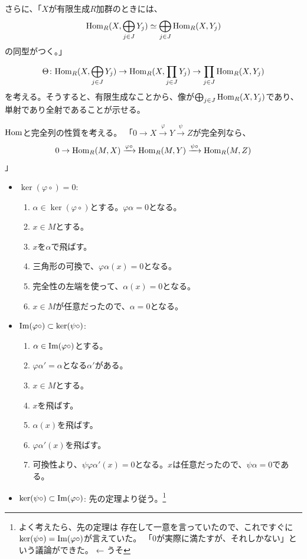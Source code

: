 \documentclass[9pt]{ltjsarticle}
\def\MARU#1{\textcircled{\scriptsize #1}}
\begin{document}
さらに、「$X$が有限生成$R$加群のときには、
\begin{align}
  \mathrm{Hom}_R(X,\bigoplus_{j\in J}Y_j)\simeq \bigoplus_{j\in J}\mathrm{Hom}_R(X,Y_j)
\end{align}
の同型がつく。」
\begin{myproof}
  \begin{align}
    \Theta\colon \mathrm{Hom}_R(X,\bigoplus_{j\in J}Y_j)
    \to
    \mathrm{Hom}_R(X,\prod_{j\in J}Y_j)
    \to
    \prod_{j\in J}\mathrm{Hom}_R(X,Y_j)
  \end{align}
  を考える。そうすると、有限生成なことから、像が$\bigoplus_{j\in J}\mathrm{Hom}_R(X,Y_j)$であり、単射であり全射であることが示せる。
\end{myproof}

$\mathrm{Hom}$と完全列の性質を考える。
「$0 \to X \xrightarrow{\varphi} Y \xrightarrow{\psi} Z$が完全列なら、
\begin{align}
  0 \to \mathrm{Hom}_R(M,X) \xrightarrow{\varphi\circ} \mathrm{Hom}_R(M,Y) \xrightarrow{\psi\circ} \mathrm{Hom}_R(M,Z)
\end{align}
」
\begin{myproof}
  \begin{itemize}
    \item $\ker(\varphi\circ)=0$:
    \begin{enumerate}[label=\MARU{\arabic*}]
      \item $\alpha \in \ker(\varphi\circ)$とする。$\varphi\alpha = 0$となる。
      \item $x\in M$とする。
      \item $x$を$\alpha$で飛ばす。
      \item 三角形の可換で、$\varphi\alpha(x)=0$となる。
      \item 完全性の左端を使って、$\alpha(x)=0$となる。
      \item $x\in M$が任意だったので、$\alpha = 0$となる。
    \end{enumerate}
    \item $\mathop\mathrm{Im} (\varphi\circ) \subset \ker (\psi\circ)$:
    \begin{enumerate}[label=\MARU{\arabic*}]
      \item $\alpha \in \mathop\mathrm{Im} (\varphi\circ)$とする。
      \item $\varphi\alpha' = \alpha$となる$\alpha'$がある。
      \item $x\in M$とする。
      \item $x$を飛ばす。
      \item $\alpha(x)$を飛ばす。
      \item $\varphi\alpha'(x)$を飛ばす。
      \item 可換性より、$\psi\varphi\alpha'(x)=0$となる。$x$は任意だったので、$\psi\alpha = 0$である。
    \end{enumerate}
    \item $\ker(\psi\circ)\subset \mathop\mathrm{Im}(\varphi\circ)$:
    先の定理より従う。\footnote{よく考えたら、先の定理は
    存在して一意を言っていたので、これですぐに$\ker(\psi\circ) = \mathop\mathrm{Im}(\varphi\circ)$が言えていた。
    「0が実際に満たすが、それしかない」という議論ができた。 ← うそ}
  \end{itemize}
\end{myproof}
\end{document}
